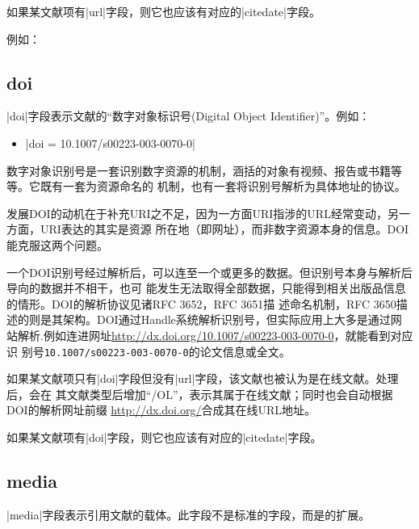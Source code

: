 如果某文献项有|url|字段，则它也应该有对应的|citedate|字段。

例如：

\subsection{doi}\label{subsec:bibfield-doi}

|doi|字段表示文献的``数字对象标识号(Digital Object Identifier)''。例如：
\begin{itemize}
\item |doi = {10.1007/s00223-003-0070-0}|
\end{itemize}

数字对象识别号是一套识别数字资源的机制，涵括的对象有视频、报告或书籍等等。它既有一套为资源命名的
机制，也有一套将识别号解析为具体地址的协议。

发展DOI的动机在于补充URI之不足，因为一方面URI指涉的URL经常变动，另一方面，URI表达的其实是资源
所在地（即网址），而非数字资源本身的信息。DOI能克服这两个问题。

一个DOI识别号经过解析后，可以连至一个或更多的数据。但识别号本身与解析后导向的数据并不相干，也可
能发生无法取得全部数据，只能得到相关出版品信息的情形。DOI的解析协议见诸RFC 3652，RFC 3651描
述命名机制，RFC 3650描述的则是其架构。DOI通过Handle系统解析识别号，但实际应用上大多是通过网
站解析.例如连进网址\url{http://dx.doi.org/10.1007/s00223-003-0070-0}，就能看到对应识
别号\texttt{10.1007/s00223-003-0070-0}的论文信息或全文。

如果某文献项只有|doi|字段但没有|url|字段，该文献也被认为是在线文献。{\BibTeX}处理后，会在
其文献类型后增加``/OL''，表示其属于在线文献；同时也会自动根据DOI的解析网址前缀
\url{http://dx.doi.org/}合成其在线URL地址。

如果某文献项有|doi|字段，则它也应该有对应的|citedate|字段。


\subsection{media}\label{subsec:bibfield-media}

|media|字段表示引用文献的载体。此字段不是标准的{\BibTeX}字段，而是{\njuthesis}的扩展。

